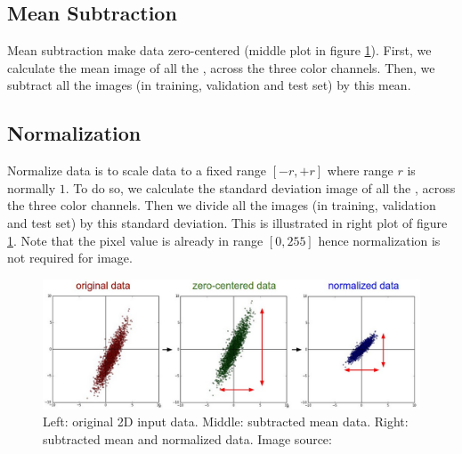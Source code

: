 \subsection{Mean Subtraction}
Mean subtraction make data zero-centered (middle plot in figure \ref{fig:prepro1}). First, we calculate the mean image of all the , across the three color channels. Then, we subtract all the images (in training, validation and test set) by this mean. 
\subsection{Normalization}
Normalize data is to scale data to a fixed range $[-r, +r]$ where range $r$ is normally $1$. To do so, we calculate the standard deviation image of all the , across the three color channels. Then we divide all the images (in training, validation and test set) by this standard deviation. This is illustrated in right plot of figure \ref{fig:prepro1}. Note that the pixel value is already in range $[0, 255]$ hence normalization is not required for image.

\begin{figure}[tb]
	\centering
	\includegraphics[width=0.9\hsize]{./figures/prepro1}
	\caption{Left: original 2D input data. Middle: subtracted mean data. Right: subtracted mean and normalized data. Image source: \cite{cs231n}}
	\label{fig:prepro1}
\end{figure}

